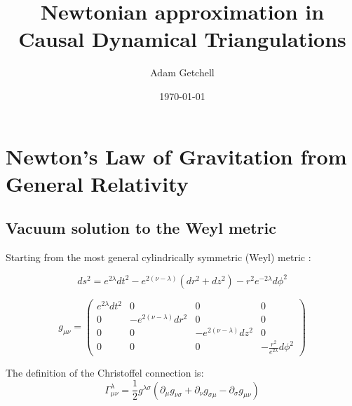 \documentclass{article}
\title{Newtonian approximation in Causal Dynamical Triangulations}
\author{Adam Getchell}
\date{\today}
\begin{document}
\maketitle
\tableofcontents

\section{Newton's Law of Gravitation from General Relativity}

\subsection{Vacuum solution to the Weyl metric}

Starting from the most general cylindrically symmetric (Weyl) metric \cite{synge_relativity}:

\begin{equation}
ds^{2}=e^{2\lambda}dt^{2}-e^{2\left(\nu-\lambda\right)}\left(dr^{2}+dz^{2}\right)-r^{2}e^{-2\lambda}d\phi^{2}\label{eq:weyl-metric}
\end{equation}

\begin{equation}
g_{\mu\nu}=\left(\begin{array}{cccc}
e^{2\lambda}dt^{2} & 0 & 0 & 0\\
0 & -e^{2\left(\nu-\lambda\right)}dr^{2} & 0 & 0\\
0 & 0 & -e^{2\left(\nu-\lambda\right)}dz^{2} & 0\\
0 & 0 & 0 & -\frac{r^{2}}{e^{2\lambda}}d\phi^{2}
\end{array}\right)\label{eq:general-axisymmetric-static-matrix-metric}
\end{equation}

The definition of the Christoffel connection is: \cite{carroll2003spacetime} 
\begin{equation}
\Gamma_{\mu\nu}^{\lambda}=\frac{1}{2}g^{\lambda\sigma}\left(\partial_{\mu}g_{\nu\sigma}+\partial_{\nu}g_{\sigma\mu}-\partial_{\sigma}g_{\mu\nu}\right)
\end{equation}
\end{document}
